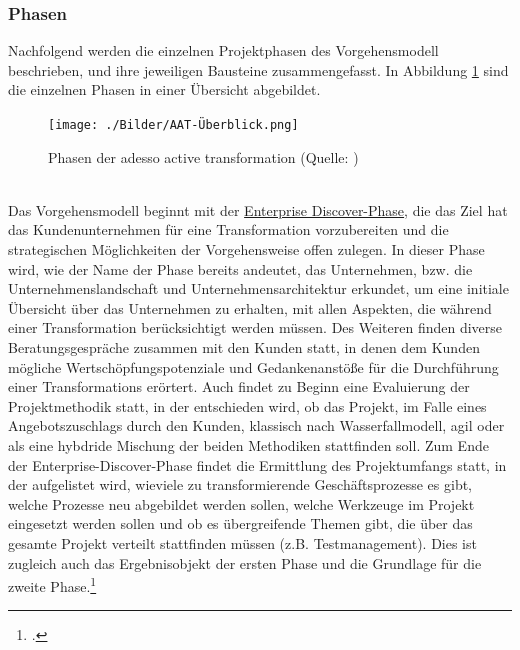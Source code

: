 \subsubsection{Phasen}
Nachfolgend werden die einzelnen Projektphasen des Vorgehensmodell beschrieben, und ihre jeweiligen Bausteine zusammengefasst. In Abbildung \ref{fig:AAT} sind die einzelnen Phasen in einer Übersicht abgebildet.
\begin{figure}[!h]
    \centering
    \texttt{[image: ./Bilder/AAT-Überblick.png]}
    \caption[Phasen des Vorgehensmodell]{Phasen der adesso active transformation (Quelle: \cite[][]{aat-phasen})}
    \label{fig:AAT}
\end{figure}
\\Das Vorgehensmodell beginnt mit der \underline{\glqq{}Enterprise Discover\grqq{}-Phase}, die das Ziel hat das Kundenunternehmen für eine Transformation vorzubereiten und die strategischen Möglichkeiten der Vorgehensweise offen zulegen. In dieser Phase wird, wie der Name der Phase bereits andeutet, das Unternehmen, bzw. die Unternehmenslandschaft und Unternehmensarchitektur erkundet, um eine initiale Übersicht über das Unternehmen zu erhalten, mit allen Aspekten, die während einer Transformation berücksichtigt werden müssen. Des Weiteren finden diverse Beratungsgespräche zusammen mit den Kunden statt, in denen dem Kunden mögliche Wertschöpfungspotenziale und Gedankenanstöße für die Durchführung einer Transformations erörtert. Auch findet zu Beginn eine Evaluierung der Projektmethodik statt, in der entschieden wird, ob das Projekt, im Falle eines Angebotszuschlags durch den Kunden, klassisch nach Wasserfallmodell, agil oder als eine hybdride Mischung der beiden Methodiken stattfinden soll. Zum Ende der Enterprise-Discover-Phase findet die Ermittlung des Projektumfangs statt, in der aufgelistet wird, wieviele zu transformierende Geschäftsprozesse es gibt, welche Prozesse neu abgebildet werden sollen, welche Werkzeuge im Projekt eingesetzt werden sollen und ob es übergreifende Themen gibt, die über das gesamte Projekt verteilt stattfinden müssen (z.B. Testmanagement). Dies ist zugleich auch das Ergebnisobjekt der ersten Phase und die Grundlage für die zweite Phase.\footcite[Vgl.][]{aat-enterprisediscover}\\
\vspace{1em}
